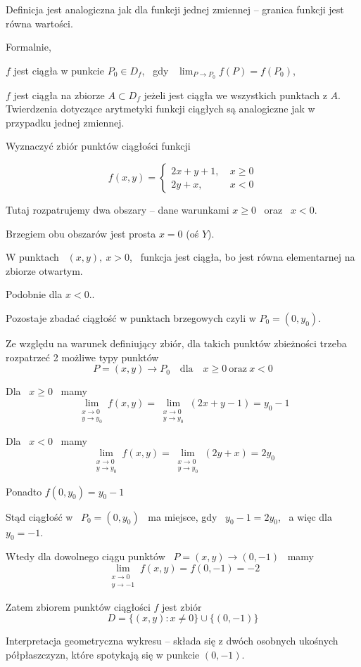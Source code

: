 Definicja jest analogiczna jak dla funkcji jednej zmiennej -- granica funkcji jest równa wartości.

Formalnie,

$f$ jest ciągła w punkcie $ P_0 \in D_f $, \ gdy \ $ \lim_{P \to P_0} f(P) = f(P_0) $,

$f$ jest ciągła na zbiorze $ A \subset D_f $ jeżeli jest ciągła we wszystkich punktach z $A$. \\

Twierdzenia dotyczące arytmetyki funkcji ciągłych są analogiczne jak w przypadku jednej zmiennej. \\

\begin{przyklad}

Wyznaczyć zbiór punktów ciągłości funkcji

$$ f(x,y) = \left\{ \begin{aligned} 2x + y + 1, & \ x \geq 0 \\ 2y + x, & \ x < 0 \end{aligned} \right. $$

Tutaj rozpatrujemy dwa obszary -- dane warunkami $ x \geq 0 $ \ oraz \ $x < 0$.

Brzegiem obu obszarów jest prosta $ x = 0 $ (oś $Y$).

W punktach \ $ (x,y), \ x > 0 $, \ funkcja jest ciągła, bo jest równa elementarnej na zbiorze otwartym.

Podobnie dla $ x < 0 $..

Pozostaje zbadać ciągłość w punktach brzegowych czyli w $ P_0  = (0, y_0) $.

Ze względu na warunek definiujący zbiór, dla takich punktów zbieżności trzeba rozpatrzeć 2 możliwe typy punktów
$$ P = (x,y) \to P_0 \quad \textrm{dla} \quad x \geq 0 \ \textrm{oraz} \ x < 0 $$

Dla \ $ x \geq 0 $ \ mamy
$$ \lim_{\substack{x \to 0 \\ y \to y_0}} f(x,y) = \lim_{\substack{x \to 0 \\ y \to y_0}} (2x + y - 1) = y_0 - 1 $$

Dla \ $ x < 0 $ \ mamy
$$ \lim_{\substack{x \to 0 \\ y \to y_0}} f(x,y) = \lim_{\substack{x \to 0 \\ y \to y_0}} (2y + x) = 2y_0 $$

Ponadto $ f(0,y_0) = y_0 - 1 $

Stąd ciągłość w \ $ P_0 = (0,y_0) $ \ ma miejsce, gdy \ $ y_0 - 1 = 2y_0 $, \ a więc dla \ $ y_0 = -1$.

Wtedy dla dowolnego ciągu punktów \ $ P = (x,y) \to (0, -1) $ \ mamy
$$ \lim_{\substack{x \to 0 \\ y \to -1}} f(x,y) = f(0,-1) = -2 $$

Zatem zbiorem punktów ciągłości $f$ jest zbiór
$$ D = \{ (x,y) : x \neq 0 \} \cup \{ (0,-1) \} $$

Interpretacja geometryczna wykresu -- składa się z dwóch osobnych ukośnych półpłaszczyzn, które spotykają
się w punkcie $(0, -1) $.
\end{przyklad}


